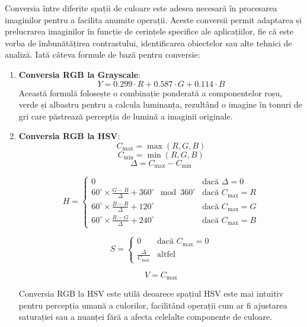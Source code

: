 Conversia între diferite spații de culoare este adesea necesară în procesarea imaginilor pentru a facilita anumite operații. Aceste conversii permit adaptarea și prelucrarea imaginilor în funcție de cerințele specifice ale aplicațiilor, fie că este vorba de îmbunătățirea contrastului, identificarea obiectelor sau alte tehnici de analiză. Iată câteva formule de bază pentru conversie:
\begin{enumerate}
    \item \textbf{Conversia RGB la Grayscale}:
          \[
              Y = 0.299 \cdot R + 0.587 \cdot G + 0.114 \cdot B
          \]
          Această formulă folosește o combinație ponderată a componentelor roșu, verde și albastru pentru a calcula luminanța, rezultând o imagine în tonuri de gri care păstrează percepția de lumină a imaginii originale.

    \item \textbf{Conversia RGB la HSV}:
          \[
              C_{\max} = \max(R, G, B)
          \]
          \[
              C_{\min} = \min(R, G, B)
          \]
          \[
              \Delta = C_{\max} - C_{\min}
          \]

          \[
              H = \begin{cases}
                  0                                                               & \text{dacă } \Delta = 0   \\
                  60^\circ \times \frac{G - B}{\Delta} + 360^\circ \mod 360^\circ & \text{dacă } C_{\max} = R \\
                  60^\circ \times \frac{B - R}{\Delta} + 120^\circ                & \text{dacă } C_{\max} = G \\
                  60^\circ \times \frac{R - G}{\Delta} + 240^\circ                & \text{dacă } C_{\max} = B
              \end{cases}
          \]

          \[
              S = \begin{cases}
                  0                       & \text{dacă } C_{\max} = 0 \\
                  \frac{\Delta}{C_{\max}} & \text{altfel}
              \end{cases}
          \]

          \[
              V = C_{\max}
          \]

          Conversia RGB la HSV este utilă deoarece spațiul HSV este mai intuitiv pentru percepția umană a culorilor, facilitând operații cum ar fi ajustarea saturației sau a nuanței fără a afecta celelalte componente de culoare.


\end{enumerate}
